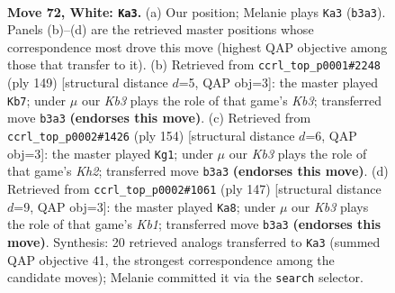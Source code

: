 \documentclass[11pt]{article}
\begin{document}
\clearpage

\begin{figure}[p]\centering
\begin{subfigure}{0.46\textwidth}\centering
\resizebox{\linewidth}{!}{%
\newchessgame
\chessboard[
  setfen={8/7k/1P5n/P7/8/1K6/7r/5R2 w - - 7 72},
  showmover=false,
  pgfstyle=straightmove, color=movearrow, markmove={b3-a3}
]}
\caption{}
\end{subfigure}\hfill
\begin{subfigure}{0.46\textwidth}\centering
\resizebox{\linewidth}{!}{%
\newchessgame
\chessboard[
  setfen={8/8/1k2K3/5N2/1p6/7r/5R2/8 b - - 8 75},
  showmover=false,
  pgfstyle=straightmove, color=movearrow, markmove={b6-b7}
]}
\caption{}
\end{subfigure}
\\[4pt]
\begin{subfigure}{0.46\textwidth}\centering
\resizebox{\linewidth}{!}{%
\newchessgame
\chessboard[
  setfen={5r2/6R1/8/8/5n2/P4k2/7K/8 w - - 20 78},
  showmover=false,
  pgfstyle=straightmove, color=movearrow, markmove={h2-g1}
]}
\caption{}
\end{subfigure}\hfill
\begin{subfigure}{0.46\textwidth}\centering
\resizebox{\linewidth}{!}{%
\newchessgame
\chessboard[
  setfen={1k6/7R/1p1N4/4K3/8/8/2r5/8 b - - 12 74},
  showmover=false,
  pgfstyle=straightmove, color=movearrow, markmove={b8-a8}
]}
\caption{}
\end{subfigure}
\caption{\textbf{Move 72, White: \texttt{Ka3}.} (a) Our position; Melanie plays \texttt{Ka3} (\texttt{b3a3}). Panels (b)--(d) are the retrieved master positions whose correspondence most drove this move (highest QAP objective among those that transfer to it). (b) Retrieved from \texttt{ccrl\_top\_p0001\#2248} (ply 149) [structural distance $d$=5, QAP obj=3]: the master played \texttt{Kb7}; under $\mu$ our \emph{Kb3} plays the role of that game's \emph{Kb3}; transferred move \texttt{b3a3} \textbf{(endorses this move)}. (c) Retrieved from \texttt{ccrl\_top\_p0002\#1426} (ply 154) [structural distance $d$=6, QAP obj=3]: the master played \texttt{Kg1}; under $\mu$ our \emph{Kb3} plays the role of that game's \emph{Kh2}; transferred move \texttt{b3a3} \textbf{(endorses this move)}. (d) Retrieved from \texttt{ccrl\_top\_p0002\#1061} (ply 147) [structural distance $d$=9, QAP obj=3]: the master played \texttt{Ka8}; under $\mu$ our \emph{Kb3} plays the role of that game's \emph{Kb1}; transferred move \texttt{b3a3} \textbf{(endorses this move)}. Synthesis: 20 retrieved analogs transferred to \texttt{Ka3} (summed QAP objective 41, the strongest correspondence among the candidate moves); Melanie committed it via the \texttt{search} selector.}
\label{fig:thought-m142}
\end{figure}
\end{document}
